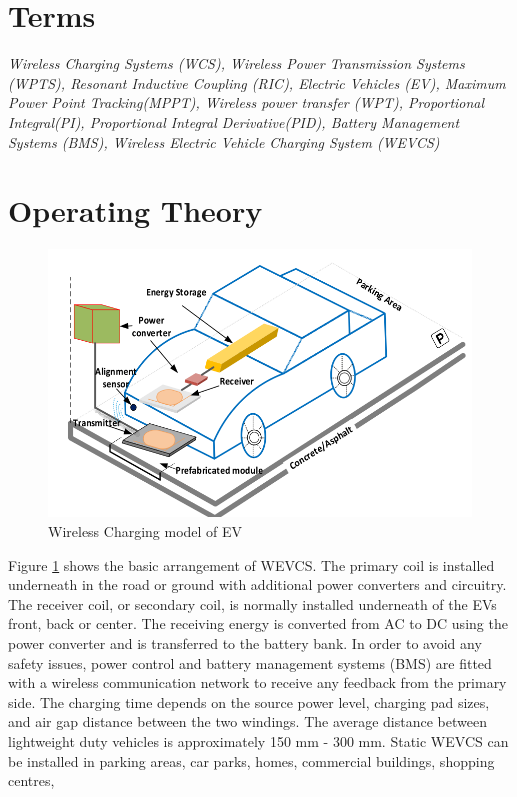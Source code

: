 \documentclass[12pt]{article}
\begin{document}
\newpage

\section{Terms}
\textit{Wireless Charging Systems (WCS), 
	Wireless Power Transmission Systems (WPTS), 
	Resonant Inductive Coupling (RIC),
	Electric Vehicles (EV), 
	Maximum Power Point Tracking(MPPT),
	Wireless power transfer (WPT),
	Proportional Integral(PI),
	Proportional Integral Derivative(PID),
	Battery Management Systems (BMS),
Wireless Electric Vehicle Charging System (WEVCS)}
\section{Operating Theory}
\begin{figure}[h]
	\centering
	\includegraphics[scale =0.75]{static.png}
	\caption{Wireless Charging model of EV}
	\label{fig:WEV}
\end{figure}
Figure \ref{fig:WEV} shows the basic arrangement of WEVCS. The primary coil is installed underneath in the road or ground with additional power converters and circuitry. The receiver coil, or secondary coil, is normally installed underneath of the EVs front, back
or center. The receiving energy is converted from AC to DC using the power converter and is transferred to the battery bank. In order to avoid any safety issues, power control and battery management systems (BMS) are fitted with a wireless communication network to receive any feedback from the primary side. The charging time depends on the source power level, charging pad sizes, and air gap distance between the two windings. The average distance between lightweight duty vehicles is approximately 150 mm - 300 mm. Static WEVCS can be installed in parking areas, car parks, homes, commercial buildings, shopping centres,
  


\end{document}

